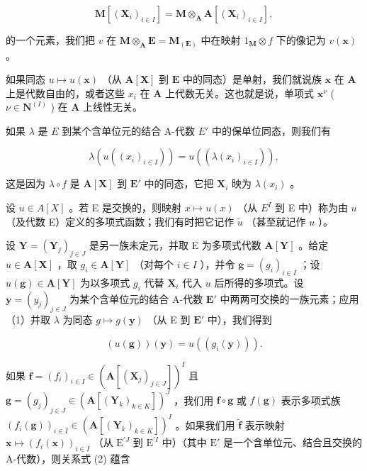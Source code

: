 \[
\mathbf {M} [ (\mathbf {X} _ {i}) _ {i \in I} ] = \mathbf {M} \otimes_ {\mathbf {A}} \mathbf {A} [ (\mathbf {X} _ {i}) _ {i \in I} ],
\]

的一个元素，我们把 \(v\) 在 \(\mathbf{M} \otimes_{\mathbf{A}} \mathbf{E} = \mathbf{M}_{(\mathbf{E})}\) 中在映射 \(1_{\mathbf{M}} \otimes f\) 下的像记为 \(v(\mathbf{x})\) 。

如果同态 \(u \mapsto u(\mathbf{x})\) （从 \(\mathbf{A}[\mathbf{X}]\) 到 \(\mathbf{E}\) 中的同态）是单射，我们就说族 \(\mathbf{x}\) 在 \(\mathbf{A}\) 上是代数自由的，或者这些 \(x_i\) 在 \(\mathbf{A}\) 上代数无关。这也就是说，单项式 \(\mathbf{x}^\nu\) ( \(\nu \in \mathbf{N}^{(I)}\) ) 在 \(\mathbf{A}\) 上线性无关。

如果 \(\lambda\) 是 \(E\) 到某个含单位元的结合 A-代数 \(E'\) 中的保单位同态，则我们有

\[
\lambda \left(u \left(\left(x _ {i}\right) _ {i \in I}\right)\right) = u \left(\left(\lambda \left(x _ {i}\right) _ {i \in I}\right)\right),\tag{1}
\]

这是因为 \(\lambda \circ f\) 是 \(\mathbf{A}[\mathbf{X}]\) 到 \(\mathbf{E}'\) 中的同态，它把 \(\mathbf{X}_i\) 映为 \(\lambda(x_i)\) 。

设 \(u \in A[X]\) 。若 E 是交换的，则映射 \(x \mapsto u(x)\) （从 \(E^{I}\) 到 E 中）称为由 \(u\) （及代数 E）定义的多项式函数；我们有时把它记作 \(\tilde{u}\) （甚至就记作 \(u\) ）。

设 \(\mathbf{Y} = (\mathbf{Y}_j)_{j\in J}\) 是另一族未定元，并取 E 为多项式代数 \(\mathbf{A}[\mathbf{Y}]\) 。给定 \(u\in \mathbf{A}[\mathbf{X}]\) ，取 \(g_{i}\in \mathbf{A}[\mathbf{Y}]\) （对每个 \(i\in I\) ），并令 \(\mathbf{g} = (g_i)_{i\in I}\) ；设 \(u(\mathbf{g})\in \mathbf{A}[\mathbf{Y}]\) 为以多项式 \(g_{i}\) 代替 \(\mathbf{X}_i\) 代入 \(u\) 后所得的多项式。设 \(\mathbf{y} = (y_j)_{j\in J}\) 为某个含单位元的结合 A-代数 \(\mathbf{E}'\) 中两两可交换的一族元素；应用（1）并取 \(\lambda\) 为同态 \(g\mapsto g(\mathbf{y})\) （从 E 到 \(\mathbf{E}'\) 中），我们得到

\[
(u (\mathbf {g})) (\mathbf {y}) = u \left(\left(g _ {i} (\mathbf {y})\right)\right).\tag{2}
\]

如果 \(\mathbf{f} = (f_i)_{i\in I}\in (\mathbf{A}[(\mathbf{X}_j)_{j\in J}])^I\) 且 \(\mathbf{g} = (g_j)_{j\in J}\in (\mathbf{A}[(\mathbf{Y}_k)_{k\in K}])^J\) ，我们用 \(\mathbf{f}\circ \mathbf{g}\) 或 \(f(\mathbf{g})\) 表示多项式族 \((f_i(\mathbf{g}))_{i\in I}\in (\mathbf{A}[(\mathbf{Y}_k)_{k\in K}])^I\) 。如果我们用 \(\tilde{\mathbf{f}}\) 表示映射 \(\mathbf{x} \mapsto (f_i(\mathbf{x}))_{i \in I}\) （从 \(\mathrm{E}^{\prime J}\) 到 \(\mathrm{E}^{\prime I}\) 中）（其中 \(\mathrm{E}'\) 是一个含单位元、结合且交换的 A-代数），则关系式 (2) 蕴含

